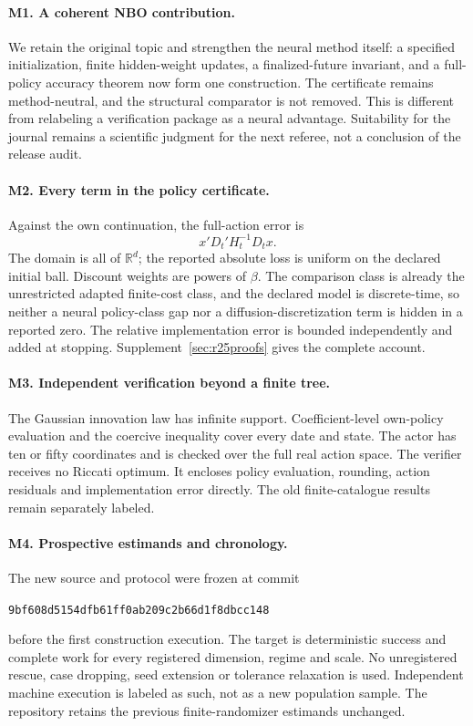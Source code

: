 \paragraph*{M1. A coherent NBO contribution.}
We retain the original topic and strengthen the neural method itself: a
specified initialization, finite hidden-weight updates, a finalized-future
invariant, and a full-policy accuracy theorem now form one construction.
The certificate remains method-neutral, and the structural comparator is
not removed. This is different from relabeling a verification package as a
neural advantage. Suitability for the journal remains a scientific judgment
for the next referee, not a conclusion of the release audit.

\paragraph*{M2. Every term in the policy certificate.}
Against the own continuation, the full-action error is
\[x'D_t'H_t^{-1}D_tx.\]
The domain is all of $\mathbb R^d$; the reported absolute loss is uniform on
the declared initial ball. Discount weights are powers of $\beta$.
The comparison class is already the unrestricted adapted finite-cost class,
and the declared model is discrete-time, so neither a neural policy-class
gap nor a diffusion-discretization term is hidden in a reported zero.
The relative implementation error is bounded independently and added at
stopping. Supplement~\ref{sec:r25proofs} gives the complete account.

\paragraph*{M3. Independent verification beyond a finite tree.}
The Gaussian innovation law has infinite support. Coefficient-level own-policy
evaluation and the coercive inequality cover every date and state. The actor
has ten or fifty coordinates and is checked over the full real action space.
The verifier receives no Riccati optimum. It encloses policy evaluation,
rounding, action residuals and implementation error directly. The old
finite-catalogue results remain separately labeled.

\paragraph*{M4. Prospective estimands and chronology.}
The new source and protocol were frozen at commit
\begin{center}\small\texttt{9bf608d5154dfb61ff0ab209c2b66d1f8dbcc148}\end{center}
before the first construction execution. The target is deterministic success and complete
work for every registered dimension, regime and scale. No unregistered rescue,
case dropping, seed extension or tolerance relaxation is used. Independent
machine execution is labeled as such, not as a new population sample. The
repository retains the previous finite-randomizer estimands unchanged.

